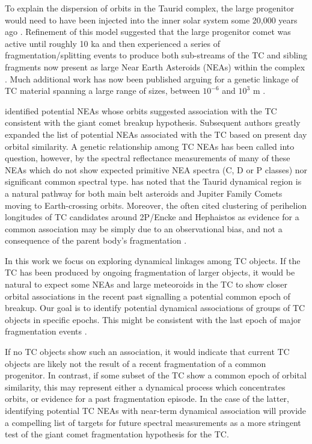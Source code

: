\documentclass[letters,a4paper,fleqn,usenatbib]{mnras}
\begin{document}
To explain the dispersion of orbits in the Taurid complex, the large progenitor would need to have been injected into the inner solar system some 20,000 years ago \citep{Steel1991, Asher1993}. Refinement of this model suggested that the large progenitor comet was active until roughly 10 ka and then experienced a series of fragmentation/splitting events to produce both sub-streams of the TC and sibling fragments now present as large Near Earth Asteroids (NEAs) within the complex \citep{Steel1991}. Much additional work has now been published arguing for a genetic linkage of TC material spanning a large range of sizes, between $10^{-6}$ and $10^3$ m \cite[e.g., in][] {Clube1984,Asher1993,Asher1993b,Asher1994,Steel1996,Steel1996b,Napier2010,Napier2015,Napier2019}.

\cite{Asher1993, Asher1994, Steel1996} identified potential NEAs whose orbits suggested association with the TC consistent with the giant comet breakup hypothesis. Subsequent authors greatly expanded the list of potential NEAs associated with the TC \citep[e.g.,][]{Babadzhanov2001, Porubcan2006, Babadzhanov2008, Jopek2011, Dumitru2017} based on present day orbital similarity. A genetic relationship among TC NEAs has been called into question, however, by the spectral reflectance measurements of many of these NEAs \citep{Popescu2014,Tubiana2015} which do not show expected primitive NEA spectra (C, D or P classes) nor significant common spectral type. \cite{Valsecchi1995} has noted that the Taurid dynamical region is a natural pathway for both main belt asteroids and Jupiter Family Comets moving to Earth-crossing orbits. Moreover, the often cited clustering of perihelion longitudes of TC candidates around 2P/Encke and Hephaistos as evidence for a common association \citep{Asher1993} may be simply due to an observational bias, and not a consequence of the parent body's fragmentation \citep{Valsecchi1999}. 

In this work we focus on exploring dynamical linkages among TC objects. If the TC has been produced by ongoing fragmentation of larger objects, it would be natural to expect some NEAs and large meteoroids in the TC to show closer orbital associations in the recent past signalling a potential common epoch of breakup. Our goal is to identify potential dynamical associations of groups of TC objects in specific epochs. This  might be consistent with the last epoch of major fragmentation events . 

If no TC objects show such an association, it would indicate that current TC objects are likely not the result of a recent fragmentation of a common progenitor. In contrast, if some subset of the TC show a common epoch of orbital similarity, this may represent either a dynamical process which concentrates orbits, or evidence for a past fragmentation episode. In the case of the latter, identifying potential TC NEAs with near-term dynamical association will provide a compelling list of targets for future spectral measurements as a more stringent test of the giant comet fragmentation hypothesis for the TC.  
\end{document}

